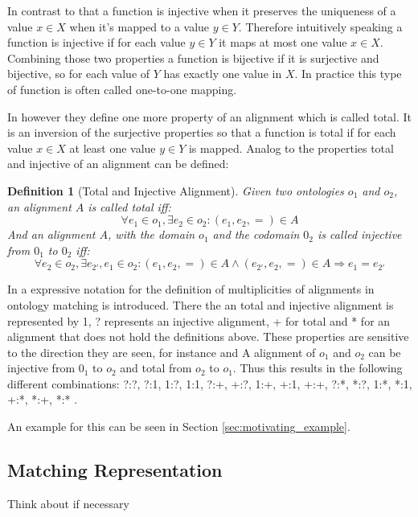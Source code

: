\documentclass[11pt,titlepage,oneside,openany,a4paper]{report}
\newtheorem{definition}{Definition}[chapter]
\begin{document}
In contrast to that a function is injective when it preserves the uniqueness of a value $x \in X$ when it's mapped to a value $y \in Y$. Therefore intuitively speaking a function is injective if for each value $y \in Y$ it maps at most one value $x \in X$.
Combining those two properties a function is bijective if it is surjective and bijective, so for each value of $Y$ has exactly one value in $X$. In practice this type of function is often called one-to-one mapping.

In \cite{euzenat2013d} however they define one more property of an alignment which is called total. It is an inversion of the surjective properties so that a function is total if for each value $x \in X$ at least one value $y \in Y$ is mapped.
Analog to \cite{euzenat2013d} the properties total and injective of an alignment can be defined:
\begin{definition} [Total and Injective Alignment]
Given two ontologies $o_1$ and $o_2$, an alignment $A$ is called total iff:
\begin{equation*}
\forall e_1 \in o_1, \exists e_2 \in o_2 : (e_1,e_2,=) \in A
\end{equation*}
And an alignment $A$, with the domain $o_1$ and the codomain $0_2$ is called injective from $0_1$ to $0_2$ iff:
\begin{equation*}
\forall e_2 \in o_2 , \exists e_{2'},e_1 \in o_2 : (e_1,e_2,=) \in A \wedge (e_{2'},e_2,=) \in A \Rightarrow e_1 = e_{2'}
\end{equation*}
\end{definition}

In \cite{euzenat2003towards} a expressive notation for the definition of multiplicities of alignments in ontology matching is introduced. There the an total and injective alignment is represented by 1, ? represents an injective alignment, + for total and * for an alignment that does not hold the definitions above. These properties are sensitive to the direction they are seen, for instance and A alignment of $o_1$ and $o_2$ can be injective from $0_1$ to $o_2$ and total from $o_2$ to $o_1$. Thus this results in the following different combinations: ?:?, ?:1, 1:?, 1:1, ?:+, +:?, 1:+, +:1, +:+, ?:*, *:?, 1:*, *:1, +:*, *:+, *:* .

An example for this can be seen in Section \ref{sec:motivating_example}.
\subsection{Matching Representation}
\begin{LARGE}
Think about if necessary
\end{LARGE}
\end{document}
